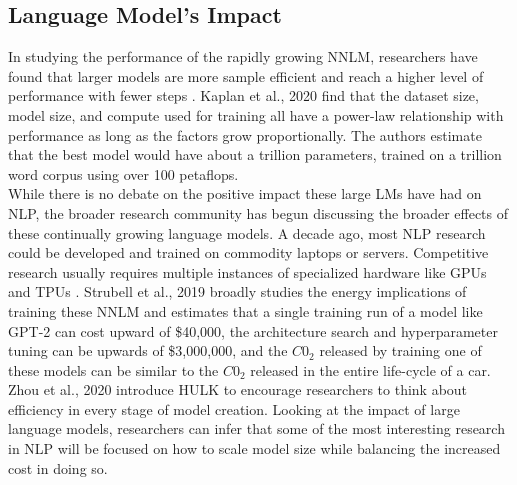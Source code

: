 \subsection{Language Model's Impact}
\label{chap:prior:sec:lm:effects}
In studying the performance of the rapidly growing NNLM, researchers have found that larger models are more sample efficient and reach a higher level of performance with fewer steps \cite{Kaplan2020ScalingLF}. Kaplan et al., 2020 find that the dataset size, model size, and compute used for training all have a power-law relationship with performance as long as the factors grow proportionally. The authors estimate that the best model would have about a trillion parameters, trained on a trillion word corpus using over 100 petaflops.\\
While there is no debate on the positive impact these large LMs have had on NLP, the broader research community has begun discussing the broader effects of these continually growing language models. A decade ago, most NLP research could be developed and trained on commodity laptops or servers. Competitive research usually requires multiple instances of specialized hardware like GPUs and TPUs \cite{Strubell2019EnergyAP}. Strubell et al., 2019 broadly studies the energy implications of training these NNLM and estimates that a single training run of a model like GPT-2 can cost upward of \$40,000, the architecture search and hyperparameter tuning can be upwards of \$3,000,000, and the $C0_2$ released by training one of these models can be similar to the $C0_2$ released in the entire life-cycle of a car. Zhou et al., 2020 \cite{Zhou2020HULKAE} introduce HULK to encourage researchers to think about efficiency in every stage of model creation. Looking at the impact of large language models, researchers can infer that some of the most interesting research in NLP will be focused on how to scale model size while balancing the increased cost in doing so. \\
